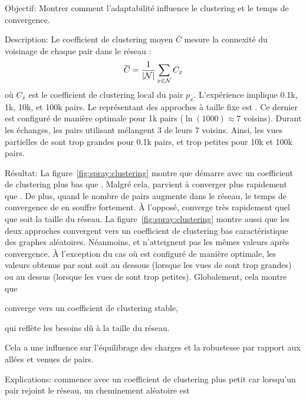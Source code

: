 \begin{asparadesc}
\item [Objectif:] Montrer comment l'adaptabilité influence le clustering et le
  temps de convergence.
\item [Description:] Le coefficient de clustering moyen $\overline{C}$ mesure la
  connexité du voisinage de chaque pair dans le réseau :
  \begin{equation}
    \overline{C} = {1\over |\mathcal{N}|}\sum\limits_{x\in\mathcal{N}}C_x
  \end{equation}
  où $C_x$ est le coefficient de clustering local du pair $p_x$. L'expérience
  implique 0.1k, 1k, 10k, et 100k pairs. Le représentant des approches à taille
  fixe est \CYCLON. Ce dernier est configuré de manière optimale pour 1k pairs
  ($\ln(1000)\approx 7$ voisins). Durant les échanges, les pairs utilisant
  \CYCLON mélangent 3 de leurs 7 voisins. Ainsi, les vues partielles de \CYCLON
  sont trop grandes pour 0.1k pairs, et trop petites pour 10k et 100k pairs.
\item [Résultat:] La figure~\ref{fig:spray:clustering} montre que \CYCLON
  démarre avec un coefficient de clustering plus bas que \SPRAY. Malgré cela,
  \SPRAY parvient à converger plus rapidement que \CYCLON. De plus, quand le
  nombre de pairs augmente dans le réseau, le temps de convergence de \CYCLON en
  souffre fortement. À l'opposé, \SPRAY converge très rapidement quel que soit
  la taille du réseau. La figure~\ref{fig:spray:clustering} montre aussi que les
  deux approches convergent vers un coefficient de clustering bas
  caractéristique des graphes aléatoires. Néanmoins, \CYCLON et \SPRAY
  n'atteignent pas les mêmes valeurs après convergence. À l'exception du cas où
  \CYCLON est configuré de manière optimale, les valeurs obtenus par \SPRAY sont
  soit au dessous (lorsque les vues de \CYCLON sont trop grandes) ou au dessus
  (lorsque les vues de \CYCLON sont trop petites). Globalement, cela montre que
  \SPRAY
  \begin{inparaenum}[(i)]
  \item converge vers un coefficient de clustering stable,
  \item qui reflète les besoins dû à la taille du réseau.
  \end{inparaenum}
  Cela a une influence sur l'équilibrage des charges et la robustesse par
  rapport aux allées et venues de pairs.    
\item [Explications:] \CYCLON commence avec un coefficient de clustering plus
  petit car lorsqu'un pair rejoint le réseau, un cheminement aléatoire est

\end{asparadesc}

